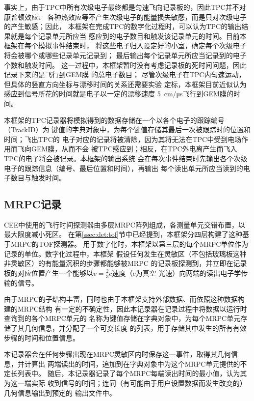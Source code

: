 \documentclass[bachelor,openany,oneside,color]{buaathesis}
\begin{document}
事实上，由于TPC中所有次级电子最终都是匀速飞向记录板的，因此TPC并不对康普顿效应、
各种热效应等不产生次级电子的能量损失敏感，而是只对次级电子的产生敏感；因此，
本框架在完成TPC的数字化过程时，可以认为TPC的输出结果就是每个记录单元所应当
感应到的电子数目和触发该记录单元的时间。目前本框架在每个模拟事件结束时，
将这些电子归入设定好的小室，确定每个次级电子将会被哪个或哪些记录单元记录到；
最后输出每个记录单元所应当记录到的电子个数和触发时间。
这一过程中，本框架暂时没有考虑记录板的死时间问题，因此记录下来的是飞行到GEM膜
的总电子数目；
尽管次级电子在TPC内匀速运动，但具体的竖直方向坐标与漂移时间的关系还需要实验
定标，本框架目前近似认为感应到信号所花的时间就是电子以一定的漂移速度
\SI{5}{\centi\meter/\micro\second}飞行到GEM膜的时间。

本框架的TPC记录器将模拟得到的数据存储在一个以各个电子的跟踪编号（TrackID）为
键值的字典对象中，为每个键值存储其最后一次被跟踪时的位置和时间；飞出TPC的
电子对应的记录将被清除，因为其将无法在TPC中受到电场作用而飞向GEM膜，从而不会
被TPC感应到；相反，在TPC外电离产生而飞入TPC的电子将会被记录。本框架的输出系统
会在每次事件结束时先输出各个次级电子的跟踪信息（编号、最后位置和时间），再输出
每个读出单元所应当读到的电子数目与触发时间。

\subsection{MRPC记录}\label{ssec:digi:MRPC}

CEE中使用的飞行时间探测器由多层MRPC阵列组成，各测量单元交错布置，以最大限度减小死区。
在第\ref{ssec:det:tof}节中已经提到，本框架分四层构建了这种基于MRPC的TOF探测器。
用于数字化时，本框架以第三层的每个MRPC单位作为记录的单位。数字化过程中，本框架
假设任何发生在灵敏区（不包括玻璃板这种非灵敏区）的有能量沉积的步骤都能够被MRPC
的记录板探测到，并立即在记录板的对应位置产生一个能够以$v=\frac23c$速度（$c$为真空
光速）向两端的读出电子学传输的信号。

由于MRPC的子结构丰富，同时也由于本框架支持外部数据、而依照这种数据构建的MRPC结构
有一定的不确定性，因此本记录器在记录过程中将数据以运行时查询到的各个MRPC单元的
名称为键值存储在字典对象中，为每个MRPC单元存储了其几何信息，并分配了一个可变长度
的列表，用于存储其中发生的所有有效步骤的时间和位置信息。

本记录器会在任何步骤出现在MRPC灵敏区内时保存这一事件，取得其几何信息，并计算出
两端读出的时间，追加到在字典对象中为这个MRPC单元提供的不定长列表中。
随后，本记录器记录了每个MRPC每端读出时间的最小值，认为其为这一端实际
收到信号的时间；连同（有可能由于用户设置数据而发生改变的）几何信息输出到预定的
输出文件中。
\end{document}

